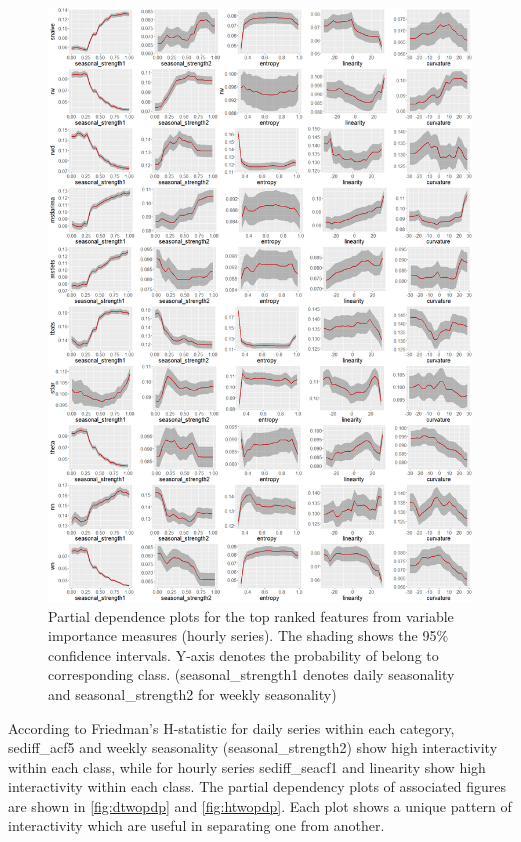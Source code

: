 \documentclass[11pt,a4paper,]{article}
\begin{document}
\begin{figure}
\centering
\includegraphics{figures/hourlypdp-1.png}
\caption{\label{fig:hourlypdp}Partial dependence plots for the top ranked
features from variable importance measures (hourly series). The shading
shows the 95\% confidence intervals. Y-axis denotes the probability of
belong to corresponding class. (seasonal\_strength1 denotes daily
seasonality and seasonal\_strength2 for weekly seasonality)}
\end{figure}

According to Friedman's H-statistic for daily series within each
category, sediff\_acf5 and weekly seasonality (seasonal\_strength2) show
high interactivity within each class, while for hourly series
sediff\_seacf1 and linearity show high interactivity within each class.
The partial dependency plots of associated figures are shown in
\autoref{fig:dtwopdp} and \autoref{fig:htwopdp}. Each plot shows a
unique pattern of interactivity which are useful in separating one from
another.
\end{document}
